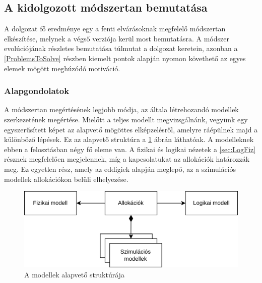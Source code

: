     \subsection{A kidolgozott módszertan bemutatása}
    A dolgozat fő eredménye egy a fenti elvárásoknak megfelelő módszertan elkészítése, melynek a végső verziója kerül most bemutatásra. A módszer evolúciójának részletes bemutatása túlmutat a dolgozat keretein, azonban a \ref{ProblemsToSolve} részben kiemelt pontok alapján nyomon követhető az egyes elemek mögött meghúzódó motiváció.
        
        \subsubsection{Alapgondolatok} \label{sec:Alapgondolatok}
        A módszertan megértésének legjobb módja, az általa létrehozandó modellek szerkezetének megértése. Mielőtt a teljes modellt megvizsgálnánk, vegyünk egy egyszerűsített képet az alapvető mögöttes elképzelésről, amelyre ráépülnek majd a különböző lépések. Ez az alapvető struktúra a \ref{fig:Alapstruktura} ábrán láthatóak.
        A modelleknek ebben a felosztásban négy fő eleme van. A fizikai és logikai nézetek a \ref{sec:LogFiz} résznek megfelelően megjelennek, míg a kapcsolatukat az allokációk határozzák meg.
        Ez egyetlen rész, amely az eddigiek alapján meglepő, az a szimulációs modellek allokációkon belüli elhelyezése.
        \begin{figure}[!ht]
            \centering
            \includegraphics[width=150mm, keepaspectratio]{figures/Alapelemek.drawio.png}
            \caption{A modellek alapvető struktúrája} 
            \label{fig:Alapstruktura}
        \end{figure}

